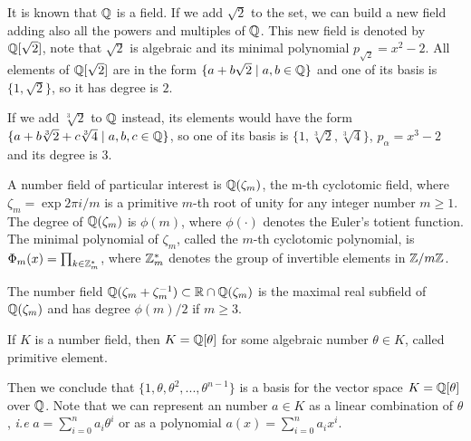 \documentclass[a4paper,12pt]{article}
\begin{document}
\begin{example}
  It is known that $\mathbb{Q}$ is a field. If we add $\sqrt{2}$ to the set, we
  can build a new field adding also all the powers and multiples of
  $\mathbb{Q}$. This new field is denoted by $\mathbb{Q}[\sqrt{2}]$, note that
  $\sqrt{2}$ is algebraic and its minimal polynomial $p_{\sqrt{2}} = x^2-2$. All
  elements of $\mathbb{Q}[\sqrt{2}]$ are in the form $\{a+b\sqrt{2} \;|\; a,b \in
  \mathbb{Q}\}$ and one of its basis is $\{1, \sqrt{2}\}$, so it has degree is
  $2$.
\end{example}

\begin{example}
  If we add $\sqrt[3]{2}$ to $\mathbb{Q}$ instead, its elements would have the
  form $\{a + b\sqrt[3]{2} + c\sqrt[3]{4} \;|\; a,b,c \in \mathbb{Q}\}$, so one of
  its basis is $\{1 ,\sqrt[3]{2} ,\sqrt[3]{4}\}$, $p_\alpha = x^3 - 2$ and its degree
  is $3$.
\end{example}

\begin{example}
  A number field of particular interest is $\mathbb{Q}(\zeta_m)$, the m-th cyclotomic field,
  where $\zeta_m = \exp{2\pi i /m}$ is a primitive $m$-th root of unity for any
  integer number $m \geq 1$. The degree of $\mathbb{Q}(\zeta_m)$ is $\phi(m)$, where $\phi(\cdot)$
  denotes the Euler’s totient function. The minimal polynomial of $\zeta_m$, called
  the $m$-th cyclotomic polynomial, is $\Phi_m(x) = \prod_{k \in \mathbb{Z}_{m}^*}$, where $\mathbb{Z}^*_m$ denotes the group of invertible elements in $\mathbb{Z}/m\mathbb{Z}$.
\end{example}

\begin{example}
  \label{ex:maximum-real-subfield}
  The number field $\mathbb{Q}(\zeta_m + \zeta_m^{-1}) \subset \mathbb{R} \cap \mathbb{Q}(\zeta_m)$ is the maximal real subfield of $\mathbb{Q}(\zeta_m)$ and has degree $\phi(m)/2$ if $m \geq 3$.
\end{example}

\begin{theorem}
   If $K$ is a number field, then $K = \mathbb{Q}[\theta]$ for some
  algebraic number $\theta \in K$, called primitive element.
\end{theorem}

Then we conclude that \(\{1, \theta, \theta^2, ... , \theta^{n-1}\}\) is a basis for the vector
space \(K = \mathbb{Q}[\theta]\) over \(\mathbb{Q}\). Note that we can represent an number \(a \in K\) as a linear combination of \(\theta\), \emph{i.e} \(a = \sum^n_{i=0}{a_i\theta^i}\) or as a polynomial \(a(x) = \sum^n_{i=0}{a_ix^i}\).
\end{document}
